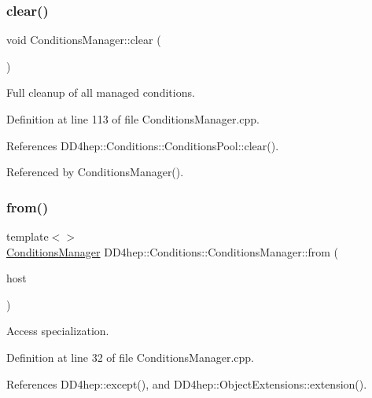 \subsubsection{\texorpdfstring{clear()}{clear()}}
{\footnotesize\ttfamily void Conditions\+Manager\+::clear (\begin{DoxyParamCaption}{ }\end{DoxyParamCaption})}



Full cleanup of all managed conditions. 



Definition at line 113 of file Conditions\+Manager.\+cpp.



References D\+D4hep\+::\+Conditions\+::\+Conditions\+Pool\+::clear().



Referenced by Conditions\+Manager().

\hypertarget{class_d_d4hep_1_1_conditions_1_1_conditions_manager_a48a6380783e7595983b0ed879046e3ea}{}\label{class_d_d4hep_1_1_conditions_1_1_conditions_manager_a48a6380783e7595983b0ed879046e3ea} 
\subsubsection{\texorpdfstring{from()}{from()}\hspace{0.1cm}{\footnotesize\ttfamily [1/2]}}
{\footnotesize\ttfamily template$<$$>$ \\
\hyperlink{class_d_d4hep_1_1_conditions_1_1_conditions_manager}{Conditions\+Manager} D\+D4hep\+::\+Conditions\+::\+Conditions\+Manager\+::from (\begin{DoxyParamCaption}\item[{\hyperlink{class_d_d4hep_1_1_geometry_1_1_l_c_d_d}{L\+C\+DD} \&}]{host }\end{DoxyParamCaption})}



Access specialization. 



Definition at line 32 of file Conditions\+Manager.\+cpp.



References D\+D4hep\+::except(), and D\+D4hep\+::\+Object\+Extensions\+::extension().


